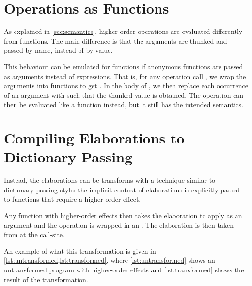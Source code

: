 \section{Operations as Functions}

As explained in \cref{sec:semantics}, higher-order operations are evaluated differently from functions. The main difference is that the arguments are thunked and passed by name, instead of by value. 

This behaviour can be emulated for functions if anonymous functions are passed as arguments instead of expressions. That is, for any operation call , we wrap the arguments into functions to get . In the body of , we then replace each occurrence of an argument  with  such that the thunked value is obtained. The  operation can then be evaluated like a function instead, but it still has the intended semantics.

\section{Compiling Elaborations to Dictionary Passing}


Instead, the elaborations can be transforms with a technique similar to dictionary-passing style: the implicit context of elaborations is explicitly passed to functions that require a higher-order effect.

Any function with higher-order effects then takes the elaboration to apply as an argument and the operation is wrapped in an . The elaboration is then taken from  at the call-site.

An example of what this transformation is given in \cref{lst:untransformed,lst:transformed}, where \cref{lst:untransformed} shows an untransformed program with higher-order effects and \cref{lst:transformed} shows the result of the transformation.

